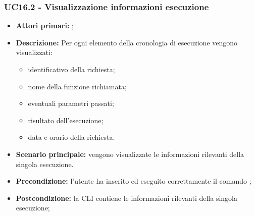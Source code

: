 \subsubsection{UC16.2 - Visualizzazione informazioni esecuzione}
\begin{itemize}
	\item \textbf{Attori primari:} \us{};
	\item \textbf{Descrizione:} Per ogni elemento della cronologia di esecuzione vengono visualizzati:
	\begin{itemize}
		\item identificativo della richiesta; 
		\item nome della funzione richiamata; 
		\item eventuali parametri passati; 
		\item risultato dell’esecuzione; 
		\item data e orario della richiesta. 
	\end{itemize}
	\item \textbf{Scenario principale:} vengono visualizzate le informazioni rilevanti della singola esecuzione.
	\item \textbf{Precondizione:} l’utente ha inserito ed eseguito correttamente il comando \history{}; 
	\item \textbf{Postcondizione:} la CLI contiene le informazioni rilevanti della singola esecuzione;
\end{itemize}